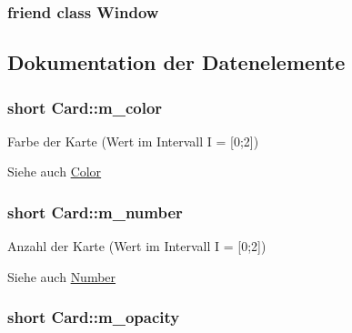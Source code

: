\subsubsection[{Window}]{\setlength{\rightskip}{0pt plus 5cm}friend class {\bf Window}\hspace{0.3cm}{\ttfamily [friend]}}\label{class_card_a553f958a25683445088050a69d3de8e9}


\subsection{Dokumentation der Datenelemente}
\hypertarget{class_card_af88f3ff917c623a87d6604d1ec57fe33}{}
\subsubsection[{m\+\_\+color}]{\setlength{\rightskip}{0pt plus 5cm}short Card\+::m\+\_\+color\hspace{0.3cm}{\ttfamily [protected]}}\label{class_card_af88f3ff917c623a87d6604d1ec57fe33}


Farbe der Karte (Wert im Intervall I = \mbox{[}0;2\mbox{]}) 

\begin{DoxySeeAlso}{Siehe auch}
\hyperlink{enums_8hpp_ab87bacfdad76e61b9412d7124be44c1c}{Color} 
\end{DoxySeeAlso}
\hypertarget{class_card_ac4dc3cf042c39c920dda9ea22b9ef751}{}
\subsubsection[{m\+\_\+number}]{\setlength{\rightskip}{0pt plus 5cm}short Card\+::m\+\_\+number\hspace{0.3cm}{\ttfamily [protected]}}\label{class_card_ac4dc3cf042c39c920dda9ea22b9ef751}


Anzahl der Karte (Wert im Intervall I = \mbox{[}0;2\mbox{]}) 

\begin{DoxySeeAlso}{Siehe auch}
\hyperlink{enums_8hpp_ad1fb407b73d9c6e54eec2180d3bc4d48}{Number} 
\end{DoxySeeAlso}
\hypertarget{class_card_a9ad7a67add760db09f496f16a8873ad8}{}
\subsubsection[{m\+\_\+opacity}]{\setlength{\rightskip}{0pt plus 5cm}short Card\+::m\+\_\+opacity\hspace{0.3cm}{\ttfamily [protected]}}\label{class_card_a9ad7a67add760db09f496f16a8873ad8}


